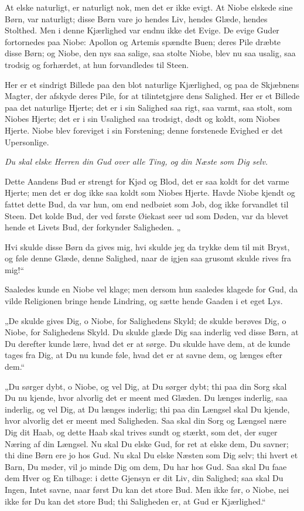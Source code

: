 \documentclass[12pt,a4paper]{book}
\newcommand{\apage}[1]{\marginnote{\footnotesize\textit{[#1]}}}
\begin{document}
At elske naturligt, er naturligt nok, men det er ikke evigt. At Niobe
elskede sine Børn, var naturligt; disse Børn vare jo hendes Liv, hendes
Glæde, hendes Stolthed. Men i denne Kjærlighed var endnu ikke det Evige.
De evige Guder fortornedes paa Niobe: Apollon og Artemis spændte Buen;
deres Pile dræbte disse Børn; og Niobe, den nys saa salige, saa stolte
Niobe, blev nu saa usalig, saa trodsig og forhærdet, at hun forvandledes
til Steen.

Her er et sindrigt Billede paa den blot naturlige Kjærlighed, og paa de
Skjæbnens Magter, der afskyde deres Pile, for at tilintetgjøre dens
Salighed. Her er et Billede paa det naturlige Hjerte; det er i sin
Salighed saa rigt, saa varmt, saa stolt, som Niobes Hjerte; det er i
sin Usalighed saa trodsigt, dødt og koldt, som Niobes Hjerte. Niobe
blev foreviget i sin Forstening; denne forstenede Evighed er det
Upersonlige.

\emph{Du skal elske Herren din Gud over alle Ting, og din Næste som Dig
selv.}

Dette Aandens Bud er strengt for Kjød og Blod, det er saa koldt for det
varme Hjerte; men det er dog ikke saa koldt som Niobes Hjerte. Havde
Niobe kjendt og fattet dette Bud, da var hun, om end nedbøiet som Job,
dog ikke forvandlet til Steen. Det kolde Bud, der ved første Øiekast
seer ud som Døden, var da blevet hende et Livets Bud, der forkynder
Saligheden.
 \apage{42}
„

Hvi skulde disse Børn da gives mig, hvi skulde jeg da trykke dem til
mit Bryst, og føle denne Glæde, denne Salighed, naar de igjen saa
grusomt skulde rives fra mig!“

Saaledes kunde en Niobe vel klage; men dersom hun saaledes klagede for
Gud, da vilde Religionen bringe hende Lindring, og sætte hende Gaaden i
et eget Lys.

„De skulde gives Dig, o Niobe, for Salighedens Skyld; de skulde berøves
Dig, o Niobe, for Salighedens Skyld. Du skulde glæde Dig saa inderlig
ved disse Børn, at Du derefter kunde lære, hvad det er at sørge. Du
skulde have dem, at de kunde tages fra Dig, at Du nu kunde føle, hvad
det er at savne dem, og længes efter dem.“

„Du sørger dybt, o Niobe, og vel Dig, at Du sørger dybt; thi paa din
Sorg skal Du nu kjende, hvor alvorlig det er meent med Glæden. Du
længes inderlig, saa inderlig, og vel Dig, at Du længes inderlig; thi
paa din Længsel skal Du kjende, hvor alvorlig det er meent med
Saligheden. Saa skal din Sorg og Længsel nære Dig dit Haab, og dette
Haab skal trives sundt og stærkt, som det, der suger Næring af din
Længsel. Nu skal Du elske Gud, for ret at elske dem, Du savner; thi
dine Børn ere jo hos Gud. Nu skal Du elske Næsten som Dig selv; thi
hvert et Barn, Du møder, vil jo minde Dig om dem, Du har hos Gud. Saa
skal Du faae dem Hver og En tilbage: i dette Gjensyn er dit Liv, din
Salighed; saa skal Du Ingen, Intet savne, naar først Du kan det store
Bud. Men ikke før, o Niobe, nei ikke før Du kan det store Bud; thi
Saligheden er, at Gud er Kjærlighed.“
\end{document}
